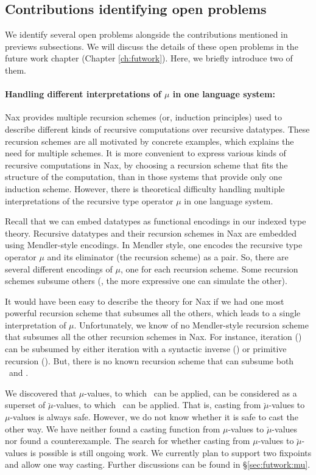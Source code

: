 \subsection{Contributions identifying open problems}
We identify several open problems alongside the contributions mentioned
in previews subsections. We will discuss the details of these open problems
in the future work chapter (Chapter \ref{ch:futwork}).
Here, we briefly introduce two of them.

\paragraph{Handling different interpretations of $\mu$ in one language system:}
Nax provides multiple recursion schemes (or, induction principles) used
to describe different kinds of recursive computations over recursive datatypes.
These recursion schemes are all motivated by concrete examples, which explains
the need for multiple schemes. It is more convenient to express various kinds of
recursive computations in Nax, by choosing a recursion scheme that fits
the structure of the computation, than in those systems that provide
only one induction scheme. However, there is theoretical difficulty
handling multiple interpretations of the recursive type operator $\mu$
in one language system.

Recall that we can embed datatypes as functional encodings in
our indexed type theory. Recursive datatypes and their recursion schemes in Nax
are embedded using Mendler-style encodings.
In Mendler style, one encodes the recursive type operator $\mu$
and its eliminator (the recursion scheme) as a pair.
So, there are several different encodings of $\mu$,
one for each recursion scheme. Some recursion schemes subsume others
(\ie, the more expressive one can simulate the other).

It would have been easy to describe the theory for Nax if we had
one most powerful recursion scheme that subsumes all the others,
which leads to a single interpretation of $\mu$. Unfortunately, we know of
no Mendler-style recursion scheme that subsumes all the other recursion schemes
in Nax. For instance, iteration (\MIt) can be subsumed by either 
iteration with a syntactic inverse (\MsfIt) or primitive recursion (\MPr).
But, there is no known recursion scheme that can subsume both \MsfIt\ and \MPr.

We discovered that $\mu$-values, to which \MIt\ can be applied,
can be considered as a superset of $\breve\mu$-values,
to which \MsfIt\ can be applied. That is, casting from $\breve\mu$-values to
$\mu$-values is always safe. However, we do not know whether it is safe to
cast the other way. We have neither found a casting function from
$\mu$-values to $\breve\mu$-values nor found a counterexample.
The search for whether casting from $\mu$-values to $\breve\mu$-values
is possible is still ongoing work. We currently plan to support two
fixpoints and allow one way casting. Further discussions can be found
in \S\ref{sec:futwork:mu}.

